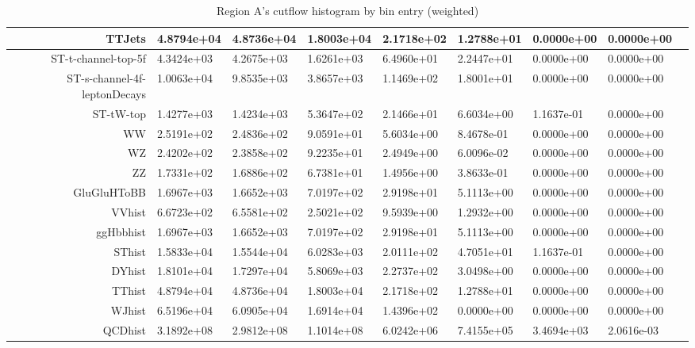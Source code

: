 \begin{landscape}
\begin{table}[htb]
\begin{tabular}{rllllllll}
 \hline 
TTJets&4.8794e+04&4.8736e+04&1.8003e+04&2.1718e+02&1.2788e+01&0.0000e+00&0.0000e+00\\
 \hline 
ST-t-channel-top-5f&4.3424e+03&4.2675e+03&1.6261e+03&6.4960e+01&2.2447e+01&0.0000e+00&0.0000e+00\\
 \hline 
ST-s-channel-4f-leptonDecays&1.0063e+04&9.8535e+03&3.8657e+03&1.1469e+02&1.8001e+01&0.0000e+00&0.0000e+00\\
 \hline 
ST-tW-top&1.4277e+03&1.4234e+03&5.3647e+02&2.1466e+01&6.6034e+00&1.1637e-01&0.0000e+00\\
 \hline 
WW&2.5191e+02&2.4836e+02&9.0591e+01&5.6034e+00&8.4678e-01&0.0000e+00&0.0000e+00\\
 \hline 
WZ&2.4202e+02&2.3858e+02&9.2235e+01&2.4949e+00&6.0096e-02&0.0000e+00&0.0000e+00\\
 \hline 
ZZ&1.7331e+02&1.6886e+02&6.7381e+01&1.4956e+00&3.8633e-01&0.0000e+00&0.0000e+00\\
 \hline 
GluGluHToBB&1.6967e+03&1.6652e+03&7.0197e+02&2.9198e+01&5.1113e+00&0.0000e+00&0.0000e+00\\
 \hline 
VVhist&6.6723e+02&6.5581e+02&2.5021e+02&9.5939e+00&1.2932e+00&0.0000e+00&0.0000e+00 \\
 \hline 
ggHbbhist&1.6967e+03&1.6652e+03&7.0197e+02&2.9198e+01&5.1113e+00&0.0000e+00&0.0000e+00 \\
 \hline 
SThist&1.5833e+04&1.5544e+04&6.0283e+03&2.0111e+02&4.7051e+01&1.1637e-01&0.0000e+00\\
 \hline 
DYhist&1.8101e+04&1.7297e+04&5.8069e+03&2.2737e+02&3.0498e+00&0.0000e+00&0.0000e+00\\
 \hline 
TThist&4.8794e+04&4.8736e+04&1.8003e+04&2.1718e+02&1.2788e+01&0.0000e+00&0.0000e+00\\
 \hline 
WJhist&6.5196e+04&6.0905e+04&1.6914e+04&1.4396e+02&0.0000e+00&0.0000e+00&0.0000e+00\\
 \hline 
QCDhist&3.1892e+08&2.9812e+08&1.1014e+08&6.0242e+06&7.4155e+05&3.4694e+03&2.0616e-03\\
\end{tabular}
\label{tab:cutfl}
\centering
\caption{Region A's cutflow histogram by bin entry (weighted)}
\end{table}
\end{landscape}



